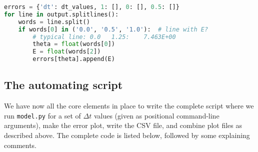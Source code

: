 \documentclass[graybox,sectrefs,envcountresetchap,open=right,final]{svmonodo}
\begin{document}
\begin{lstlisting}[language=Python,style=blue1_bluegreen]
errors = {'dt': dt_values, 1: [], 0: [], 0.5: []}
for line in output.splitlines():
    words = line.split()
    if words[0] in ('0.0', '0.5', '1.0'):  # line with E?
        # typical line: 0.0   1.25:    7.463E+00
        theta = float(words[0])
        E = float(words[2])
        errors[theta].append(E)
\end{lstlisting}

\subsection{The automating script}

We have now all the core elements in place to write the complete
script where we run
\texttt{model.py} for a set of $\Delta t$ values (given as positional
command-line arguments), make the error plot,
write the CSV file, and combine plot files as described above.
The complete code is listed below, followed by some explaining comments.
\end{document}
